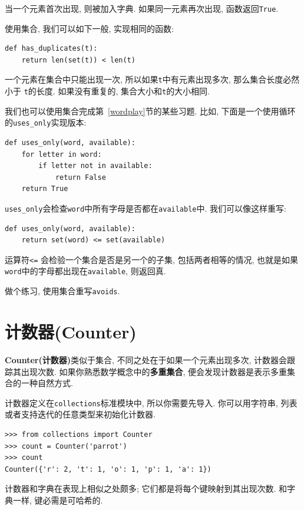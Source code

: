 \documentclass[10pt]{book}
\begin{document}
当一个元素首次出现, 则被加入字典. 
如果同一元素再次出现, 函数返回{\tt True}. 

使用集合, 我们可以如下一般, 实现相同的函数:

\begin{verbatim}
def has_duplicates(t):
    return len(set(t)) < len(t)
\end{verbatim}
%
一个元素在集合中只能出现一次, 所以如果{\tt t}中有元素出现多次, 那么集合长度必然小于
{\tt t}的长度. 
如果没有重复的, 集合大小和{\tt t}的大小相同. 

我们也可以使用集合完成第~\ref{wordplay}节的某些习题. 
比如, 下面是一个使用循环的\verb"uses_only"实现版本:

\begin{verbatim}
def uses_only(word, available):
    for letter in word: 
        if letter not in available:
            return False
    return True
\end{verbatim}
%
\verb"uses_only"会检查{\tt word}中所有字母是否都在{\tt available}中.
我们可以像这样重写:

\begin{verbatim}
def uses_only(word, available):
    return set(word) <= set(available)
\end{verbatim}
%

运算符\verb"<=" 会检验一个集合是否是另一个的子集, 包括两者相等的情况, 
也就是如果{\tt word}中的字母都出现在{\tt available}, 则返回真. 

做个练习, 使用集合重写\verb"avoids". 


\section{计数器(Counter)}

{\bf Counter(计数器)}类似于集合, 不同之处在于如果一个元素出现多次, 计数器会跟踪其出现次数. 
如果你熟悉数学概念中的{\bf 多重集合}, 便会发现计数器是表示多重集合的一种自然方式. 

计数器定义在{\tt collections}标准模块中, 
所以你需要先导入. 
你可以用字符串, 列表或者支持迭代的任意类型来初始化计数器. 

\begin{verbatim}
>>> from collections import Counter
>>> count = Counter('parrot')
>>> count
Counter({'r': 2, 't': 1, 'o': 1, 'p': 1, 'a': 1})
\end{verbatim}

计数器和字典在表现上相似之处颇多;
它们都是将每个键映射到其出现次数. 
和字典一样, 键必需是可哈希的. 
\end{document}
